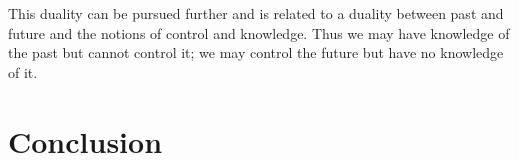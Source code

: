 \begin{savequote}[0.55\linewidth]
	\begin{fancyquote}
		This duality can be pursued further and is related to a duality
		between past and future and the notions of control and
		knowledge. Thus we may have knowledge of the past but cannot
		control it; we may control the future but have no knowledge of
		it.
	\end{fancyquote}
\end{savequote}
\chapter{Conclusion}\label{ch:conclusion}
